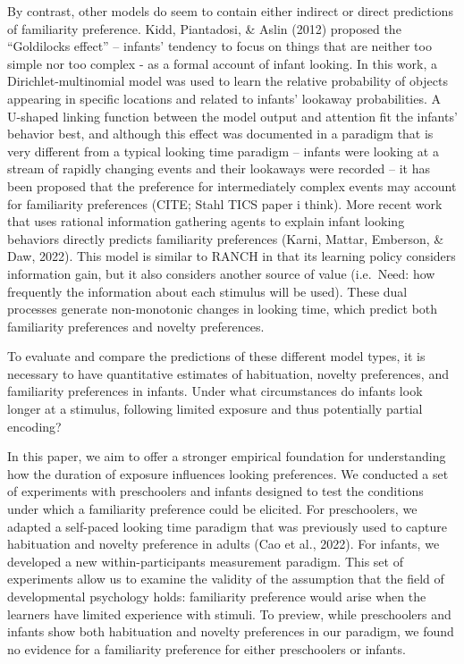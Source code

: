 \documentclass[10pt, letterpaper]{article}
\begin{document}
By contrast, other models do seem to contain either indirect or direct
predictions of familiarity preference. Kidd, Piantadosi, \& Aslin (2012)
proposed the ``Goldilocks effect'' -- infants' tendency to focus on
things that are neither too simple nor too complex - as a formal account
of infant looking. In this work, a Dirichlet-multinomial model was used
to learn the relative probability of objects appearing in specific
locations and related to infants' lookaway probabilities. A U-shaped
linking function between the model output and attention fit the infants'
behavior best, and although this effect was documented in a paradigm
that is very different from a typical looking time paradigm -- infants
were looking at a stream of rapidly changing events and their lookaways
were recorded -- it has been proposed that the preference for
intermediately complex events may account for familiarity preferences
(CITE; Stahl TICS paper i think). More recent work that uses rational
information gathering agents to explain infant looking behaviors
directly predicts familiarity preferences (Karni, Mattar, Emberson, \&
Daw, 2022). This model is similar to RANCH in that its learning policy
considers information gain, but it also considers another source of
value (i.e.~Need: how frequently the information about each stimulus
will be used). These dual processes generate non-monotonic changes in
looking time, which predict both familiarity preferences and novelty
preferences.

To evaluate and compare the predictions of these different model types,
it is necessary to have quantitative estimates of habituation, novelty
preferences, and familiarity preferences in infants. Under what
circumstances do infants look longer at a stimulus, following limited
exposure and thus potentially partial encoding?

In this paper, we aim to offer a stronger empirical foundation for
understanding how the duration of exposure influences looking
preferences. We conducted a set of experiments with preschoolers and
infants designed to test the conditions under which a familiarity
preference could be elicited. For preschoolers, we adapted a self-paced
looking time paradigm that was previously used to capture habituation
and novelty preference in adults (Cao et al., 2022). For infants, we
developed a new within-participants measurement paradigm. This set of
experiments allow us to examine the validity of the assumption that the
field of developmental psychology holds: familiarity preference would
arise when the learners have limited experience with stimuli. To
preview, while preschoolers and infants show both habituation and
novelty preferences in our paradigm, we found no evidence for a
familiarity preference for either preschoolers or infants.
\end{document}
